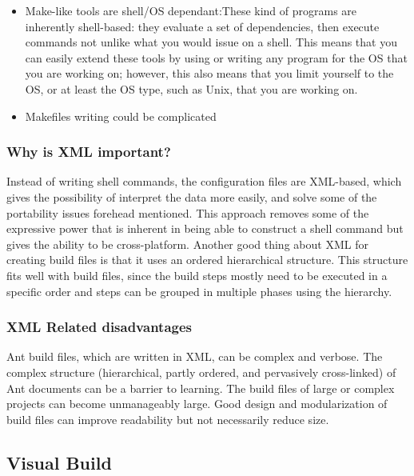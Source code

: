 \begin{itemize}

\item Make-like tools are shell/OS dependant:These kind of programs are inherently shell-based: they evaluate a set of dependencies, then execute commands not unlike what you would issue on a shell. This means that you can easily extend these tools by using or writing any program for the OS that you are working on; however, this also means that you limit yourself to the OS, or at least the OS type, such as Unix, that you are working on.

\item Makefiles writing could be complicated

\end{itemize}


\subsubsection{Why is XML important?}

Instead of writing shell commands, the configuration files are XML-based, which gives the possibility of interpret the data more easily, and solve some of the portability issues forehead mentioned. This approach removes some of the expressive power that is inherent in being able to construct a shell command but gives the ability to be cross-platform. Another good thing about XML for creating build files is that it uses an ordered hierarchical structure. This structure fits well with build files, since the build steps mostly need to be executed in a specific order and steps can be grouped in multiple phases using the hierarchy.


\subsubsection{XML Related disadvantages}

Ant build files, which are written in XML, can be complex and verbose. The complex structure (hierarchical, partly ordered, and pervasively cross-linked) of Ant documents can be a barrier to learning. The build files of large or complex projects can become unmanageably large. Good design and modularization of build files can improve readability but not necessarily reduce size.

\subsection{Visual Build}
